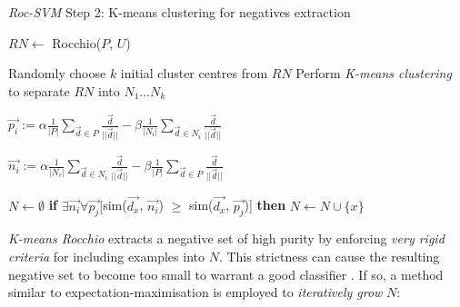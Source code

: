 \documentclass[12pt,twoside,notitlepage,amsart]{report} %
\begin{document}
	\begin{algorithm}
	  \caption{\emph{Roc-SVM} Step 2: K-means clustering for negatives extraction
	    \label{alg:rocsvm2}}
	  \begin{algorithmic}[1]
	    \Statex
	      \State $RN \gets$ Rocchio($P$, $U$)
	      
	      \State Randomly choose $k$ initial cluster centres from $RN$ 
	      \State Perform \emph{K-means clustering} to separate $RN$ into $N_1 \ldots N_k$
	      
							
							
							\State $\displaystyle \vec{p_i} := \alpha \frac{1}{|P|} \sum_{\vec{d} \in P}{ \frac{\vec{d}}{||\vec{d}||}} - \beta \frac{1}{|N_i|} \sum_{\vec{d} \in N_i}{ \frac{\vec{d}}{||\vec{d}||}} $ 
							
	        		 
	        		\State $\displaystyle \vec{n_i} := \alpha \frac{1}{|N_i|} \sum_{\vec{d} \in N_i}{ \frac{\vec{d}}{||\vec{d}||}} - \beta \frac{1}{|P|} \sum_{\vec{d} \in P}{ \frac{\vec{d}}{||\vec{d}||}} $
	      	
	      	\EndFor
	      
	      \Statex
	      \State $N \gets \emptyset$
							\State \textbf{if} $\exists \vec{n_i} \forall \vec{p_j} [$sim($\vec{d_x}$, $\vec{n_i}$) $\geq$ sim($\vec{d_x}$, $\vec{p_j}$)] \textbf{then} 
							\State $N \gets N \cup \{ x \}$
	      	\EndFor
	
	      
				\Statex
	      
	  \end{algorithmic}
	\end{algorithm}
	
	\emph{K-means Rocchio} extracts a negative set of high purity by enforcing \emph{very rigid criteria} for including examples into $N$. This strictness can cause the resulting negative set to become too small to warrant a good classifier \cite{Li03}. If so, a method similar to expectation-maximisation is employed to \emph{iteratively grow} $N$: 
	
\end{document}

